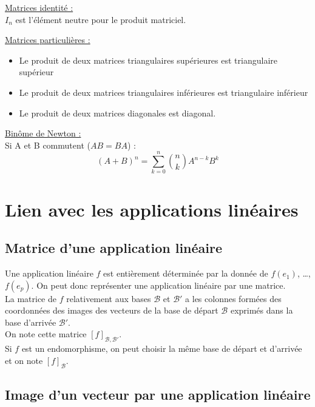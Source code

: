         \underline{Matrices identité :}\\
        $I_n$ est l'élément neutre pour le produit matriciel.\vspace{5pt}
        
        \underline{Matrices particulières :}
        \begin{itemize}
            \item Le produit de deux matrices triangulaires supérieures est triangulaire supérieur
            \item Le produit de deux matrices triangulaires inférieures est triangulaire inférieur
            \item Le produit de deux matrices diagonales est diagonal\vspace{5pt}.
        \end{itemize}
        
        \underline{Binôme de Newton :}\\
        Si A et B commutent ($AB = BA$) :
        \[ (A + B)^n = \sum_{k=0}^{n} \binom{n}{k} A^{n-k} B^k \]


\section{Lien avec les applications linéaires}
    
    \subsection{Matrice d'une application linéaire}
        
        Une application linéaire $f$ est entièrement déterminée par la donnée de $f(e_1)$, \ldots, $f(e_p)$.
        On peut donc représenter une application linéaire par une matrice.\\
        
        La matrice de $f$ relativement aux bases $\mathcal{B}$ et $\mathcal{B}'$ a les colonnes formées des coordonnées des images des vecteurs de la base de départ $\mathcal{B}$ exprimés dans la base d'arrivée $\mathcal{B}'$.\\
        On note cette matrice $[f]_{\mathcal{B},\mathcal{B}'}$.\\
        
        Si $f$ est un endomorphisme, on peut choisir la même base  de départ et d'arrivée et on note $[f]_{\mathcal{B}}$.
    
    \subsection{Image d'un vecteur par une application linéaire}
        
